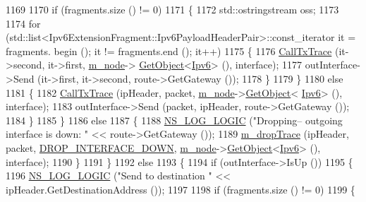 \begin{DoxyCode}
1169 
1170           \textcolor{keywordflow}{if} (fragments.size () != 0)
1171             \{
1172               std::ostringstream oss;
1173 
1174               \textcolor{keywordflow}{for} (std::list<Ipv6ExtensionFragment::Ipv6PayloadHeaderPair>::const\_iterator it = fragments.
      begin (); it != fragments.end (); it++)
1175                 \{
1176                   \hyperlink{classns3_1_1Ipv6L3Protocol_a40e29e34a97639ad1caad6b64e732454}{CallTxTrace} (it->second, it->first, \hyperlink{classns3_1_1Ipv6L3Protocol_a543d8509395ee76de15d039ff1fce642}{m\_node}->
      \hyperlink{classns3_1_1Object_a13e18c00017096c8381eb651d5bd0783}{GetObject}<\hyperlink{classns3_1_1Ipv6_adccc58acd14d3f9a28f75dc09e794998}{Ipv6}> (), interface);
1177                   outInterface->Send (it->first, it->second, route->GetGateway ());
1178                 \}
1179             \}
1180           \textcolor{keywordflow}{else}
1181             \{
1182               \hyperlink{classns3_1_1Ipv6L3Protocol_a40e29e34a97639ad1caad6b64e732454}{CallTxTrace} (ipHeader, packet, \hyperlink{classns3_1_1Ipv6L3Protocol_a543d8509395ee76de15d039ff1fce642}{m\_node}->\hyperlink{classns3_1_1Object_a13e18c00017096c8381eb651d5bd0783}{GetObject}<
      \hyperlink{classns3_1_1Ipv6_adccc58acd14d3f9a28f75dc09e794998}{Ipv6}> (), interface);
1183               outInterface->Send (packet, ipHeader, route->GetGateway ());
1184             \}
1185         \}
1186       \textcolor{keywordflow}{else}
1187         \{
1188           \hyperlink{group__logging_ga88acd260151caf2db9c0fc84997f45ce}{NS\_LOG\_LOGIC} (\textcolor{stringliteral}{"Dropping-- outgoing interface is down: "} << route->GetGateway ());
1189           \hyperlink{classns3_1_1Ipv6L3Protocol_ac22d2d63cac436267ae6cafc46880a6e}{m\_dropTrace} (ipHeader, packet, \hyperlink{classns3_1_1Ipv6L3Protocol_a33c64db9bc35f71ff368b132bfffa37aa72b499545685a47a7cf3588d1330d5d0}{DROP\_INTERFACE\_DOWN}, 
      \hyperlink{classns3_1_1Ipv6L3Protocol_a543d8509395ee76de15d039ff1fce642}{m\_node}->\hyperlink{classns3_1_1Object_a13e18c00017096c8381eb651d5bd0783}{GetObject}<\hyperlink{classns3_1_1Ipv6_adccc58acd14d3f9a28f75dc09e794998}{Ipv6}> (), interface);
1190         \}
1191     \}
1192   \textcolor{keywordflow}{else}
1193     \{
1194       \textcolor{keywordflow}{if} (outInterface->IsUp ())
1195         \{
1196           \hyperlink{group__logging_ga88acd260151caf2db9c0fc84997f45ce}{NS\_LOG\_LOGIC} (\textcolor{stringliteral}{"Send to destination "} << ipHeader.GetDestinationAddress ());
1197 
1198           \textcolor{keywordflow}{if} (fragments.size () != 0)
1199             \{

\end{DoxyCode}

